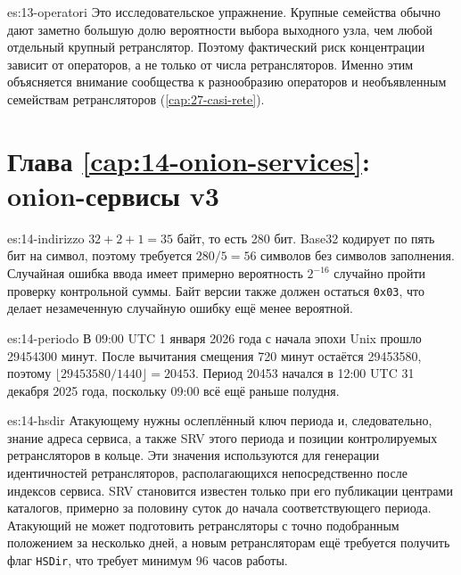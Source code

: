 \begin{soluzione}{es:13-operatori}
Это исследовательское упражнение. Крупные семейства обычно дают заметно большую долю вероятности выбора выходного узла, чем любой отдельный крупный ретранслятор. Поэтому фактический риск концентрации зависит от операторов, а не только от числа ретрансляторов. Именно этим объясняется внимание сообщества к разнообразию операторов и необъявленным семействам ретрансляторов (\cref{cap:27-casi-rete}).
\end{soluzione}

\section*{Глава \ref{cap:14-onion-services}: onion-сервисы v3}

\begin{soluzione}{es:14-indirizzo}
$32 + 2 + 1 = 35$ байт, то есть 280 бит. Base32 кодирует по пять бит на символ, поэтому требуется $280/5 = 56$ символов без символов заполнения. Случайная ошибка ввода имеет примерно вероятность $2^{-16}$ случайно пройти проверку контрольной суммы. Байт версии также должен остаться \texttt{0x03}, что делает незамеченную случайную ошибку ещё менее вероятной.
\end{soluzione}

\begin{soluzione}{es:14-periodo}
В 09:00 UTC 1 января 2026 года с начала эпохи Unix прошло \num{29454300} минут. После вычитания смещения 720 минут остаётся \num{29453580}, поэтому $\lfloor 29453580 / 1440 \rfloor = 20453$. Период \num{20453} начался в 12:00 UTC 31 декабря 2025 года, поскольку 09:00 всё ещё раньше полудня.
\end{soluzione}

\begin{soluzione}{es:14-hsdir}
Атакующему нужны ослеплённый ключ периода и, следовательно, знание адреса сервиса, а также SRV этого периода и позиции контролируемых ретрансляторов в кольце. Эти значения используются для генерации идентичностей ретрансляторов, располагающихся непосредственно после индексов сервиса. SRV становится известен только при его публикации центрами каталогов, примерно за половину суток до начала соответствующего периода. Атакующий не может подготовить ретрансляторы с точно подобранным положением за несколько дней, а новым ретрансляторам ещё требуется получить флаг \texttt{HSDir}, что требует минимум 96 часов работы.
\end{soluzione}

